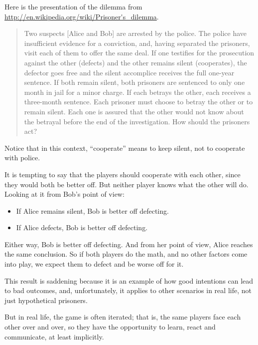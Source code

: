 \documentclass[10pt]{book}
\begin{document}
Here is the presentation of the dilemma from
\url{http://en.wikipedia.org/wiki/Prisoner's_dilemma}.

\begin{quote}
Two suspects [Alice and Bob] are arrested by the police.  The police
have insufficient evidence for a conviction, and, having separated the
prisoners, visit each of them to offer the same deal.  If one
testifies for the prosecution against the other (defects) and the
other remains silent (cooperates), the defector goes free and the
silent accomplice receives the full one-year sentence.  If both remain
silent, both prisoners are sentenced to only one month in jail for a
minor charge. If each betrays the other, each receives a three-month
sentence. Each prisoner must choose to betray the other or to remain
silent. Each one is assured that the other would not know about the
betrayal before the end of the investigation.  How should the
prisoners act?
\end{quote}

Notice that in this context, ``cooperate'' means to keep silent,
not to cooperate with police.

It is tempting to say that the players should cooperate with each
other, since they would both be better off.  But neither player knows
what the other will do.  Looking at it from Bob's point of view:

\begin{itemize}

\item If Alice remains silent, Bob is better off defecting.

\item If Alice defects, Bob is better off defecting.

\end{itemize}

Either way, Bob is better off defecting.  And from her point of view,
Alice reaches the same conclusion.  So if both players do the math,
and no other factors come into play, we expect them to defect and be
worse off for it.

This result is saddening because it is an example of how good intentions
can lead to bad outcomes, and, unfortunately, it applies to other
scenarios in real life, not just hypothetical prisoners.

But in real life, the game is often iterated; that is, the same
players face each other over and over, so they have the opportunity
to learn, react and communicate, at least implicitly.
\end{document}
